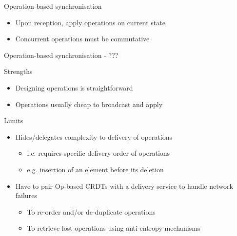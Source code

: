 \begin{frame}{Operation-based synchronisation}
\begin{figure}[!ht]
{
        }
      \end{figure}

    \begin{itemize}
        \item Upon reception, \alert{apply operations on current state}
        \item \alert{Concurrent operations} must be \alert{commutative}
    \end{itemize}
\end{frame}

\begin{frame}{Operation-based synchronisation - ???}

    \begin{block}{Strengths}
        \begin{itemize}
            \item Designing operations is straightforward
            \item Operations usually cheap to broadcast and apply
        \end{itemize}
    \end{block}
    \begin{block}{Limits}
        \begin{itemize}
            \item Hides/delegates complexity to delivery of operations
            \begin{itemize}
                \item i.e. requires specific delivery order of operations
                \item e.g. insertion of an element before its deletion
            \end{itemize}
            \item Have to pair Op-based CRDTs with a delivery service to handle network failures
            \begin{itemize}
                \item To re-order and/or de-duplicate operations
                \item To retrieve lost operations using anti-entropy mechanisms
            \end{itemize}
        \end{itemize}
    \end{block}
\end{frame}